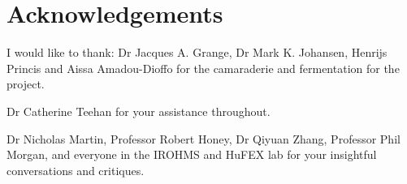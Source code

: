 \section*{Acknowledgements}

\tab I would like to thank:
Dr Jacques A. Grange, Dr Mark K. Johansen, Henrijs Princis and Aissa Amadou-Dioffo for the camaraderie and fermentation for the project.

Dr Catherine Teehan for your assistance throughout.

Dr Nicholas Martin, Professor Robert Honey, Dr Qiyuan Zhang, Professor Phil Morgan, and everyone in the IROHMS and HuFEX lab for your insightful conversations and critiques.

